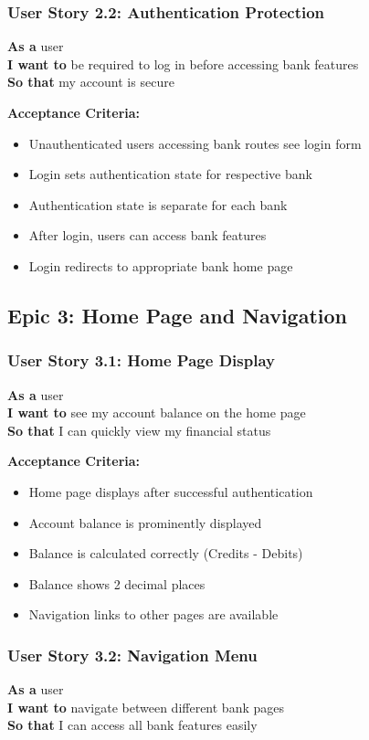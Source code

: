 \documentclass[11pt,a4paper]{article}
\begin{document}
\subsubsection{User Story 2.2: Authentication Protection}
\textbf{As a} user\\
\textbf{I want to} be required to log in before accessing bank features\\
\textbf{So that} my account is secure

\textbf{Acceptance Criteria:}
\begin{itemize}[leftmargin=*]
    \item Unauthenticated users accessing bank routes see login form
    \item Login sets authentication state for respective bank
    \item Authentication state is separate for each bank
    \item After login, users can access bank features
    \item Login redirects to appropriate bank home page
\end{itemize}

\subsection{Epic 3: Home Page and Navigation}

\subsubsection{User Story 3.1: Home Page Display}
\textbf{As a} user\\
\textbf{I want to} see my account balance on the home page\\
\textbf{So that} I can quickly view my financial status

\textbf{Acceptance Criteria:}
\begin{itemize}[leftmargin=*]
    \item Home page displays after successful authentication
    \item Account balance is prominently displayed
    \item Balance is calculated correctly (Credits - Debits)
    \item Balance shows 2 decimal places
    \item Navigation links to other pages are available
\end{itemize}

\subsubsection{User Story 3.2: Navigation Menu}
\textbf{As a} user\\
\textbf{I want to} navigate between different bank pages\\
\textbf{So that} I can access all bank features easily
\end{document}
